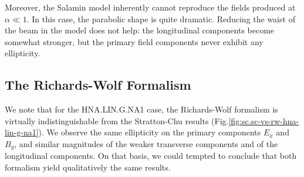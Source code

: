 \documentclass[11pt,SymmetricalJury]{inrsthesis/inrsthesis}
\begin{document}
Moreover, the Salamin model inherently cannot reproduce the fields produced at
$\alpha\ll1$. In this case, the parabolic shape is quite dramatic. Reducing the
waist of the beam in the model does not help: the longitudinal components become
somewhat stronger, but the primary field components never exhibit any
ellipticity.


\subsection{The Richards-Wolf Formalism}

We note that for the HNA.LIN.G.NA1 case, the Richards-Wolf formalism is
virtually indistinguishable from the Stratton-Chu results
(Fig.\ref{fig:sc.sc-vs-rw-hna-lin-g-na1}). We observe the same ellipticity on
the primary components $E_x$ and $B_y$, and similar magnitudes of the weaker
transverse components and of the longitudinal components. On that basis, we
could tempted to conclude that both formalism yield qualitatively the same
results.
\end{document}
